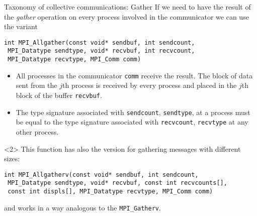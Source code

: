 \documentclass[xcolor={svgnames,usenames}]{beamer}
\begin{document}
\begin{frame}[fragile]{Taxonomy of collective communications: Gather}
\small
If we need to have the result of the \emph{gather} operation on every process involved in the communicator we can use the variant
\begin{verbatim}
int MPI_Allgather(const void* sendbuf, int sendcount,
 MPI_Datatype sendtype, void* recvbuf, int recvcount,
 MPI_Datatype recvtype, MPI_Comm comm)
\end{verbatim}
\begin{itemize}
	\item All processes in the communicator \texttt{comm} receive the result. The block of data sent from the $j$th process is received
	by every process and placed in the $j$th block of the buffer \texttt{recvbuf}.
	\item The type signature associated with \texttt{sendcount}, \texttt{sendtype}, at a process must be equal to
	the type signature associated with \texttt{recvcount}, \texttt{recvtype} at any other process.
\end{itemize}
\begin{onlyenv}<2>
This function has also the version for gathering messages with different sizes:
\begin{verbatim}
int MPI_Allgatherv(const void* sendbuf, int sendcount,
 MPI_Datatype sendtype, void* recvbuf, const int recvcounts[],
 const int displs[], MPI_Datatype recvtype, MPI_Comm comm)
\end{verbatim}
and works in a way analogous to the \texttt{MPI_Gatherv}.
\end{onlyenv}
\end{frame}
\end{document}
